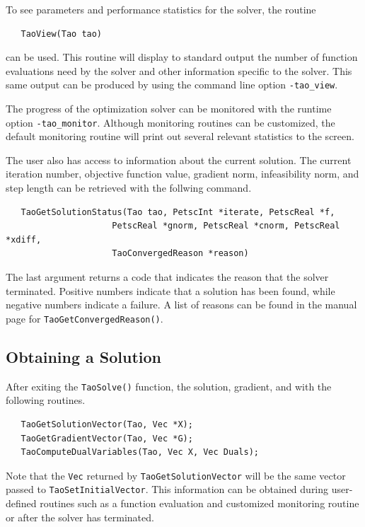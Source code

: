 \documentclass[]{book}
\begin{document}
To see parameters and performance statistics for the solver, the
routine
\begin{verbatim}
   TaoView(Tao tao)
\end{verbatim}
can be used.  This routine will display to standard output the number
of function evaluations need by the solver and other information
specific to the solver.  This same output can be produced by using the 
command line option {\tt -tao\_view}.

The progress of the optimization solver can be monitored with
the runtime option {\tt -tao\_monitor}.  Although monitoring routines
can be customized, the default monitoring routine will print out 
several relevant statistics to the screen.

The user also has access to information about the current solution.
The current iteration number, objective function value, gradient
norm, infeasibility norm, and step length 
can be retrieved with the follwing command.
\begin{verbatim}
   TaoGetSolutionStatus(Tao tao, PetscInt *iterate, PetscReal *f,
                     PetscReal *gnorm, PetscReal *cnorm, PetscReal *xdiff,
                     TaoConvergedReason *reason)
\end{verbatim}
The last argument returns a code that indicates the reason that the solver 
terminated.  Positive 
numbers indicate that a solution has been found, while negative numbers
indicate a failure.  A list of reasons can be found in the manual page
for {\tt Tao\-Get\-Converged\-Reason()}.

\subsection{Obtaining a Solution}

After exiting the {\tt Tao\-Solve()} function, the solution, gradient, and 
with the following routines.
\begin{verbatim}
   TaoGetSolutionVector(Tao, Vec *X);
   TaoGetGradientVector(Tao, Vec *G);
   TaoComputeDualVariables(Tao, Vec X, Vec Duals);
\end{verbatim}
Note that the {\tt Vec} returned by {\tt TaoGetSolutionVector} will be
the same vector passed to {\tt TaoSetInitialVector}.  This information 
can be obtained during user-defined routines such as a function evaluation 
and customized monitoring routine or after the solver has terminated.
\end{document}
